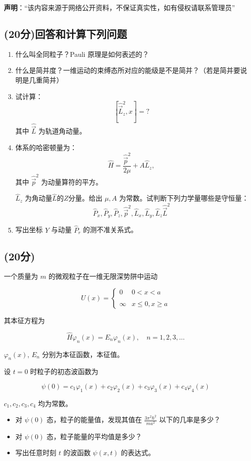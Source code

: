 
\textbf{声明}：“该内容来源于网络公开资料，不保证真实性，如有侵权请联系管理员”

\subsection{(20分)回答和计算下列问题}
\begin{enumerate}
    \item  什么叫全同粒子？Pauli 原理是如何表述的？

    \item  什么是简并度？一维运动的束缚态所对应的能级是不是简并？（若是简并要说明是几重简并）

    \item  试计算：
    \[    \left[\hat{\vec{L}}^2_z, x\right] = ?  ~\]
    其中 $\hat{\vec{L}}$ 为轨道角动量。

    \item  体系的哈密顿量为：
    \[    \hat{H} = \frac{\hat{\vec{p}}^2}{2\mu} + A\hat{L}_z,  ~\]
    其中 $\hat{\vec{p}}^2$ 为动量算符的平方。

    $\hat{L}_z$ 为角动量$\hat{L}$的$Z$分量。给出 $ \mu, A$ 为常数。试判断下列力学量哪些是守恒量：
    \[  \hat{P}_x, \hat{P}_y, \hat{P}_z,\hat{\vec{p}}^2, \hat{L}_x, \hat{L}_y, \hat{L}_z \hat{\vec{L}}^2~\]

    \item  写出坐标 $Y$ 与动量 $\hat{P}_r$ 的测不准关系式。
\end{enumerate}
\subsection{(20分)}
一个质量为 $m$ 的微观粒子在一维无限深势阱中运动

\[U(x) = \begin{cases} 0 & 0 < x < a \\\\\infty & x \leq 0, x \geq a \end{cases}~\]

其本征方程为

\[\hat{H} \varphi_n (x) = E_n \varphi_n (x), \quad n = 1, 2, 3, \ldots~\]

\(\varphi_n (x)\), \(E_n\) 分别为本征函数，本征值。

设 \( t = 0 \) 时粒子的初态波函数为

\[\psi (0) = c_1 \varphi_1 (x) + c_2 \varphi_2 (x) + c_3 \varphi_3 (x) + c_4 \varphi_4 (x)~\]

\(c_1, c_2, c_3, c_4\) 均为常数。

\begin{itemize}
  \item  对 \( \psi (0) \) 态，粒子的能量值，发现其值在 \( \frac{3\pi^2 \hbar^2}{ma^2} \) 以下的几率是多少？
  \item  对 \( \psi (0) \) 态，粒子能量的平均值是多少？
  \item  写出任意时刻 \( t \) 的波函数 \( \psi (x, t) \) 的表达式。
\end{itemize}